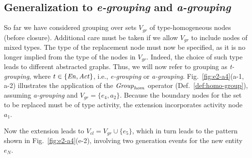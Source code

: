 

\subsection{Generalization to \textit{e-grouping} and \textit{a-grouping}}
\label{sec:generalisation}

So far we have considered grouping over sets $V_{gr}$ of type-homogeneous nodes (before closure). Additional care must be taken if we allow $V_{gr}$ to include nodes of mixed types.  The type of the replacement node must now be specified, as it is no longer implied from the type of the nodes in $V_{gr}$. Indeed, the choice of such type leads to different abstracted graphs. Thus, we will now refer to grouping as \textit{t-grouping}, where $t \in \{ \mathit{En}, \mathit{Act}\}$, i.e., \textit{e-grouping} or \textit{a-grouping}. Fig.~\ref{fig:e2-a4}(a-1, a-2) illustrates the application of the $\mathit{Group}_{hom}$ operator (Def.~\ref{def:homo-group}), assuming \textit{a-grouping} and $V_{gr} = \{ e_4, a_2\}$. Because the boundary nodes for the set to be replaced must be of type activity, the extension incorporates activity node $a_1$.




   
%
Now the extension leads to $V_{cl} = V_{gr} \cup \{ e_5\}$, which in turn leads to the pattern shown in Fig.~\ref{fig:e2-a4}(e-2), involving two generation events for the new entity $e_{N}$.

